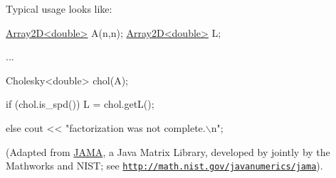 Typical usage looks like\-: 
\begin{DoxyPre}
 \hyperlink{classTNT_1_1Array2D}{Array2D<double>} A(n,n);
 \hyperlink{classTNT_1_1Array2D}{Array2D<double>} L;\end{DoxyPre}



\begin{DoxyPre}  ...\end{DoxyPre}



\begin{DoxyPre} Cholesky<double> chol(A);\end{DoxyPre}



\begin{DoxyPre} if (chol.is\_spd())
    L = chol.getL();\end{DoxyPre}



\begin{DoxyPre} else
    cout << "factorization was not complete.\(\backslash\)n";\end{DoxyPre}



\begin{DoxyPre} \end{DoxyPre}


(Adapted from \hyperlink{namespaceJAMA}{J\-A\-M\-A}, a Java Matrix Library, developed by jointly by the Mathworks and N\-I\-S\-T; see \href{http://math.nist.gov/javanumerics/jama}{\tt http\-://math.\-nist.\-gov/javanumerics/jama}). 

